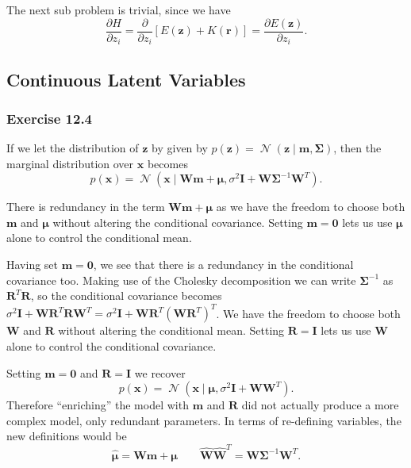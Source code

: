 \documentclass[12pt, a4paper]{article}
\newcommand{\vect}[1]{\bm{#1}}
\DeclareMathOperator{\N}{\mathcal{N}}
\begin{document}
The next sub problem is trivial, since we have
\begin{equation*}
	\frac{\partial H}{\partial z_i}
	= \frac{\partial}{\partial z_i} \left[ E(\vect{z}) + K(\vect{r}) \right]
	=  \frac{\partial E(\vect{z})}{\partial z_i}.
\end{equation*}

\subsection{Continuous Latent Variables}

\subsubsection*{Exercise 12.4}
If we let the distribution of $\vect{z}$ by given by $p(\vect{z}) = \N (\vect{z} \mid \vect{m}, \vect{\Sigma})$, then the marginal distribution over $\vect{x}$ becomes 
\begin{equation*}
p(\vect{x}) = \N (\vect{x} \mid \vect{W} \vect{m} + \vect{\mu}, \sigma^2 \vect{I} + \vect{W} \vect{\Sigma}^{-1} \vect{W}^T).
\end{equation*}

There is redundancy in the term $\vect{W} \vect{m} + \vect{\mu}$ as we have the freedom to choose both $\vect{m}$ and $\vect{\mu}$ without altering the conditional covariance. 
Setting $\vect{m} = \vect{0}$ lets us use $\vect{\mu}$ alone to control the conditional mean.

Having set $\vect{m} = \vect{0}$, we see that there is a redundancy in the conditional covariance too.
Making use of the Cholesky decomposition we can write $\vect{\Sigma}^{-1}$ as $\vect{R}^T\vect{R}$, so the conditional covariance becomes
$\sigma^2 \vect{I} + \vect{W} \vect{R}^T\vect{R} \vect{W}^T
=
\sigma^2 \vect{I} + \vect{W} \vect{R}^T \left( \vect{W} \vect{R}^T \right)^T$.
We have the freedom to choose both $\vect{W}$ and $\vect{R}$ without altering the conditional mean.
Setting $\vect{R} = \vect{I}$ lets us use $\vect{W}$ alone to control the conditional covariance.

Setting $\vect{m} = \vect{0}$ and $\vect{R} = \vect{I}$ we recover
\begin{equation*}
p(\vect{x}) = \N (\vect{x} \mid \vect{\mu}, \sigma^2 \vect{I} + \vect{W}  \vect{W}^T).
\end{equation*}
Therefore ``enriching'' the model with $\vect{m}$ and $\vect{R}$ did not actually produce a more complex model, only redundant parameters.
In terms of re-defining variables, the new definitions would be
\begin{equation*}
	\widehat{\vect{\mu}} = \vect{W} \vect{m} + \vect{\mu}
	\qquad
	\widehat{\vect{W}} \widehat{\vect{W}}^T
	=
	\vect{W} \vect{\Sigma}^{-1} \vect{W}^T.
\end{equation*}
\end{document}
